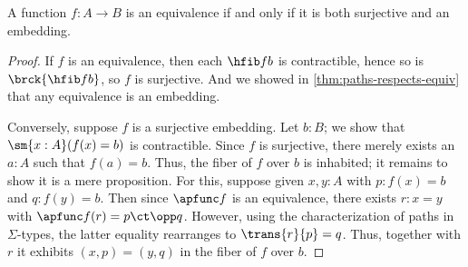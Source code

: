 %
\begin{thm}\label{thm:mono-surj-equiv}
  A function $f:A\to B$ is an equivalence if and only if it is both surjective and an embedding.
\end{thm}

\begin{proof}
  If $f$ is an equivalence, then each $\hfib f b$ is contractible, hence so is $\brck{\hfib f b}$, so $f$ is surjective.
  And we showed in \cref{thm:paths-respects-equiv} that any equivalence is an embedding.

  Conversely, suppose $f$ is a surjective embedding.
  Let $b:B$; we show that $\sm{x:A}(f(x)=b)$ is contractible.
  Since $f$ is surjective, there merely exists an $a:A$ such that $f(a)=b$.
  Thus, the fiber of $f$ over $b$ is inhabited; it remains to show it is a mere proposition.
  For this, suppose given $x,y:A$ with $p:f(x)=b$ and $q:f(y)=b$.
  Then since $\apfunc f$ is an equivalence, there exists $r:x=y$ with $\apfunc f (r) = p \ct \opp q$.
  However, using the characterization of paths in $\Sigma$-types, the latter equality rearranges to $\trans{r}{p} = q$.
  Thus, together with $r$ it exhibits $(x,p) = (y,q)$ in the fiber of $f$ over $b$.
\end{proof}
